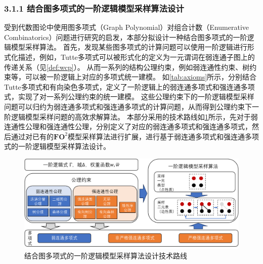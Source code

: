 \documentclass[12pt,UTF8,AutoFakeBold=3,a4paper]{ctexart} %
\newcommand{\fotwo}{\ensuremath{\mathbf{FO}^2}}
\begin{document}
\subsubsection{3.1.1 结合图多项式的一阶逻辑模型采样算法设计}


受到代数图论中使用图多项式（Graph Polynomial）对组合计数（Enumerative Combinatorics）问题进行研究的启发，本部分拟设计一种结合图多项式的一阶逻辑模型采样算法。
首先，发现某些图多项式的计算问题可以使用一阶逻辑进行形式化描述，例如，Tutte多项式可以被形式化的定义为一元谓词在弱连通子图上的传递关系（见\cref{def:wcp}）。
从而一系列的结构公理约束，例如弱连通性约束、树约束等，可以被一阶逻辑上对应的多项式统一建模。
如\cref{tab:axioms}所示，分别结合Tutte多项式和有向染色多项式，定义了一阶逻辑上的弱连通多项式和强连通多项式，实现了对一系列公理约束的统一建模。
这些公理约束下的一阶逻辑模型采样问题可以归约为弱连通多项式和强连通多项式的计算问题，从而得到公理约束下一阶逻辑模型采样问题的高效求解算法。
本部分采用的技术路线如\cref{fig:polynomial}所示，先对于弱连通性公理和强连通性公理，分别定义了对应的弱连通多项式和强连通多项式，然后通过对已有的\fotwo{}模型采样算法进行扩展，进行基于弱连通多项式和强连通多项式的一阶逻辑模型采样算法设计。

\begin{figure}[t]
  \centering
  \includegraphics[width=\textwidth]{figs/polynomial.pdf}
  \caption{结合图多项式的一阶逻辑模型采样算法设计技术路线}
  \label{fig:polynomial}
\end{figure}
\end{document}
